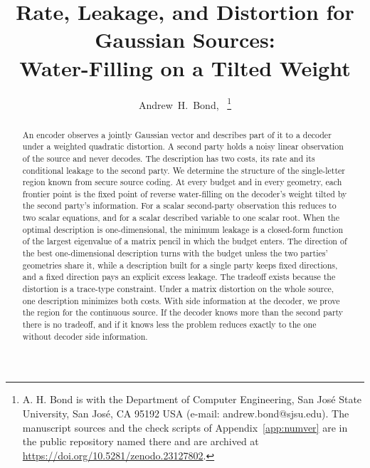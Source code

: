 \documentclass[11pt,onecolumn]{IEEEtran}
\begin{document}
\title{Rate, Leakage, and Distortion for Gaussian Sources:\\ Water-Filling on a Tilted Weight}

\author{Andrew~H.~Bond,~%
\thanks{A. H. Bond is with the Department of Computer Engineering, San Jos\'e
State University, San Jos\'e, CA 95192 USA (e-mail: andrew.bond@sjsu.edu).
The manuscript sources and the check scripts of Appendix~\ref{app:numver}
are in the public repository named there and are archived at
\url{https://doi.org/10.5281/zenodo.23127802}.}}


\maketitle

\begin{abstract}
An encoder observes a jointly Gaussian vector and describes part of it
to a decoder under a weighted quadratic distortion. A second party
holds a noisy linear observation of the source and never decodes. The
description has two costs, its rate and its conditional leakage to the
second party. We determine the structure of the single-letter region
known from secure source coding. At every budget and in every
geometry, each frontier point is the fixed point of reverse
water-filling on the decoder's weight tilted by the second party's
information. For a scalar second-party observation this reduces to two
scalar equations, and for a scalar described variable to one scalar
root. When the optimal description is one-dimensional, the minimum
leakage is a closed-form function
of the largest eigenvalue of a matrix pencil in which the budget enters.
The direction of the best one-dimensional description turns with the
budget unless the two parties' geometries share it, while a description
built for a single party keeps fixed directions, and a fixed direction
pays an explicit excess leakage. The tradeoff exists because the
distortion is a trace-type constraint. Under a matrix distortion on the
whole source, one description minimizes both costs. With side
information at the decoder, we prove the region for the continuous
source. If the decoder knows more than the second party there is no
tradeoff, and if it knows less the problem reduces exactly to the one
without decoder side information.
\end{abstract}
\end{document}

